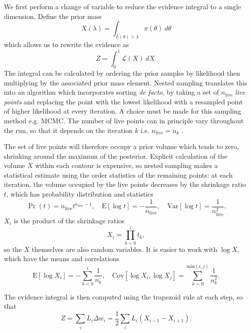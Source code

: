 \documentclass[usenatbib]{mnras} %
\newcommand{\nlive}{n_\mathrm{live}}
\newcommand{\Like}{\mathcal{L}}
\begin{document}
We first perform a change of variable to reduce the evidence integral to a single dimension. Define the prior mass 
\begin{equation}\label{X integral}
    X(\lambda) = \int_{L(\theta)>\lambda} \pi(\theta) \ d\theta 
\end{equation}
which allows us to rewrite the evidence as 
\begin{equation}
    Z = \int_0^1 \Like(X) \ dX.
\end{equation}
The integral can be calculated by ordering the prior samples by likelihood then multiplying by the associated prior mass element. Nested sampling translates this into an algorithm which incorporates sorting \textit{de facto}, by taking a set of $\nlive$ \textit{live points} and replacing the point with the lowest likelihood with a resampled point of higher likelihood at every iteration. A choice must be made for this sampling method e.g. MCMC. The number of live points can in principle vary throughout the run, so that it depends on the iteration $k$ i.e. $n_\mathrm{live}=n_k$ \citep{dynamic_ns}. 
\par
The set of live points will therefore occupy a prior volume which tends to zero, shrinking around the maximum of the posterior. Explicit calculation of the volume $X$ within each contour is expensive, so nested sampling makes a statistical estimate using the order statistics of the remaining points: at each iteration, the volume occupied by the live points decreases by the shrinkage ratio $t$, which has probability distribution and statistics
\begin{equation}
	\Pr(t) = \nlive t^{\nlive - 1}, \quad \mathrm{E}[\log t] = -\frac{1}{\nlive}, \quad \mathrm{Var}[\log t] = \frac{1}{\nlive^2}.
\end{equation}
$X_i$ is the product of the shrinkage ratios
\begin{equation}\label{xi_formula}
    X_i = \prod_{k=0}^{i} t_k,
\end{equation}
so the $X$ themselves are also random variables. It is easier to work with $\log X$, which have the means and correlations
\begin{equation}\label{X_distribution}
	\mathrm{E}[\log X_i] = -\sum_{k=0}^{i} \frac{1}{n_k}, \quad
	\mathrm{Cov}[\log X_i, \log X_j] = \sum_{k=0}^{\mathrm{min}(i, j)} \frac{1}{n_k^2}.
\end{equation}

The evidence integral is then computed using the trapezoid rule at each step, so that
\begin{equation}
	Z = \sum_i L_i \Delta w_i = \frac{1}{2}\sum_i L_i \left( X_{i-1} - X_{i+1} \right).
\end{equation}
\end{document}
